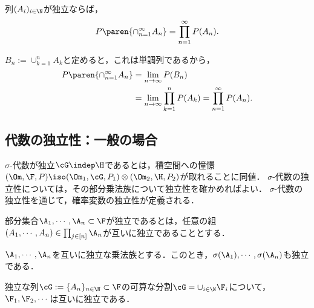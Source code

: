 \documentclass[uplatex,dvipdfmx]{jsreport}
\begin{document}
\begin{lemma}[独立事象に対する確率の関手性]\label{lemma-functority-on-independence}
    列$(A_i)_{i\in\N}$が独立ならば，
    \[P\paren{\cap^\infty_{n=1}A_n}=\prod_{n=1}^\infty P(A_n).\]
\end{lemma}
\begin{Proof}
    $B_n:=\cup^n_{k=1}A_k$と定めると，これは単調列であるから，
    \begin{align*}
        P\paren{\cap^\infty_{n=1}A_n}&=\lim_{n\to\infty}P(B_n)\\
        &=\lim_{n\to\infty}\prod_{k=1}^nP(A_k)=\prod_{n=1}^\infty P(A_n).
    \end{align*}
\end{Proof}

\subsection{代数の独立性：一般の場合}

\begin{tcolorbox}[colframe=ForestGreen, colback=ForestGreen!10!white,breakable,colbacktitle=ForestGreen!40!white,coltitle=black,fonttitle=\bfseries\sffamily,
title=]
    $\sigma$-代数が独立$\cG\indep\H$であるとは，積空間への憧憬$(\Om,\F,P)\iso(\Om_1,\cG,P_1)\otimes(\Om_2,\H,P_2)$が取れることに同値．
    $\sigma$-代数の独立性については，その部分乗法族について独立性を確かめればよい．
    $\sigma$-代数の独立性を通じて，確率変数の独立性が定義される．
\end{tcolorbox}

\begin{definition}
    部分集合$\A_1,\cdots,\A_n\subset\F$が独立であるとは，任意の組$(A_1,\cdots,A_n)\in\prod_{j\in[n]}\A_n$が互いに独立であることとする．
\end{definition}

\begin{theorem}
    $\A_1,\cdots,\A_n$を互いに独立な乗法族とする．このとき，$\sigma(\A_1),\cdots,\sigma(\A_n)$も独立である．
\end{theorem}

\begin{corollary}
    独立な列$\cG:=\{A_n\}_{n\in\N}\subset\F$の可算な分割$\cG=\cup_{i\in\N}\F_i$について，$\F_1,\F_2,\cdots$は互いに独立である．
\end{corollary}
\end{document}
